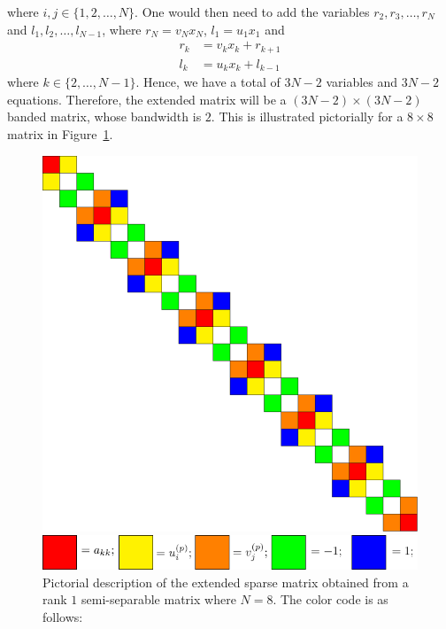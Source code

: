 \documentclass[final,leqno]{siamltex}
\begin{document}
where $i,j \in \{1,2,\ldots,N\}$. One would then need to add the variables $r_2,r_3,\ldots,r_N$ and $l_1,l_2,\ldots,l_{N-1}$, where $r_N = v_N x_N$, $l_1 = u_1x_1$ and
\begin{align}
r_k & = v_kx_k + r_{k+1}\\
l_k & = u_kx_k + l_{k-1}
\end{align}
where $k \in \{2,\ldots,N-1\}$. Hence, we have a total of $3N-2$ variables and $3N-2$ equations. Therefore, the extended matrix will be a $(3N-2) \times (3N-2)$ banded matrix, whose bandwidth is $2$. This is illustrated pictorially for a $8 \times 8$ matrix in Figure~\ref{fig_rank1_semiseparable}.

\begin{figure}[!htbp]
\begin{center}
\includegraphics[scale=0.5]{./images/1termsemiseparable.pdf}
\end{center}
\begin{center}
\includegraphics[scale=1]{./images/colorcode.pdf}
\end{center}
\caption{Pictorial description of the extended sparse matrix obtained from a rank $1$ semi-separable matrix where $N=8$. The color code is as follows: }
\label{fig_rank1_semiseparable}
\end{figure}
\end{document}
